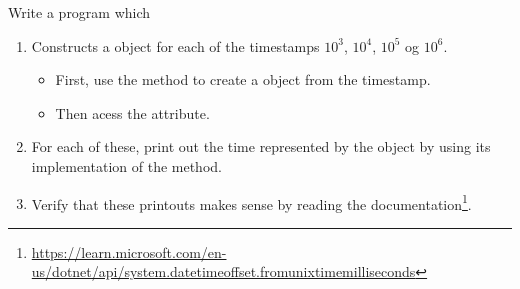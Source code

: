 Write a program which
\begin{enumerate}
  \item Constructs a  object for each of the timestamps $10^3$, $10^4$, $10^5$ og $10^6$.
    \begin{itemize}
      \item First, use the  method to create a  object from the timestamp.
      \item Then acess the  attribute.
    \end{itemize}
  \item For each of these, print out the time represented by the object by using its implementation of the  method.
  \item Verify that these printouts makes sense by reading the documentation\footnote{\url{https://learn.microsoft.com/en-us/dotnet/api/system.datetimeoffset.fromunixtimemilliseconds}}.
\end{enumerate}

